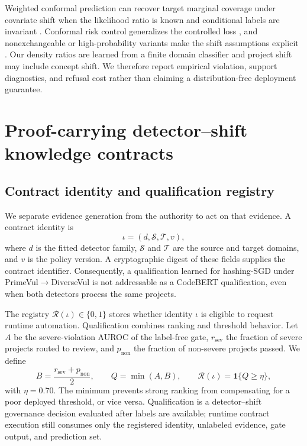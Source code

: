 \documentclass[preprint,12pt]{elsarticle}
\begin{document}
Weighted conformal prediction can recover target marginal coverage under covariate shift when the likelihood ratio is known and conditional labels are invariant \cite{tibshirani2019weightedcp}. Conformal risk control generalizes the controlled loss \cite{angelopoulos2024crc}, and nonexchangeable or high-probability variants make the shift assumptions explicit \cite{farinhas2024necrc,almeida2025hpcrc}. Our density ratios are learned from a finite domain classifier and project shift may include concept shift. We therefore report empirical violation, support diagnostics, and refusal cost rather than claiming a distribution-free deployment guarantee.

\section{Proof-carrying detector--shift knowledge contracts}

\subsection{Contract identity and qualification registry}

We separate evidence generation from the authority to act on that evidence. A contract identity is
\begin{equation}
 \iota=(d,\mathcal S,\mathcal T,v),
 \label{eq:identity}
\end{equation}
where $d$ is the fitted detector family, $\mathcal S$ and $\mathcal T$ are the source and target domains, and $v$ is the policy version. A cryptographic digest of these fields supplies the contract identifier. Consequently, a qualification learned for hashing-SGD under PrimeVul$\rightarrow$DiverseVul is not addressable as a CodeBERT qualification, even when both detectors process the same projects.

The registry $\mathcal R(\iota)\in\{0,1\}$ stores whether identity $\iota$ is eligible to request runtime automation. Qualification combines ranking and threshold behavior. Let $A$ be the severe-violation AUROC of the label-free gate, $r_{\mathrm{sev}}$ the fraction of severe projects routed to review, and $p_{\mathrm{non}}$ the fraction of non-severe projects passed. We define
\begin{equation}
 B=\frac{r_{\mathrm{sev}}+p_{\mathrm{non}}}{2},
 \qquad
 Q=\min(A,B),
 \qquad
 \mathcal R(\iota)=\mathbf 1\{Q\geq\eta\},
 \label{eq:qualification}
\end{equation}
with $\eta=0.70$. The minimum prevents strong ranking from compensating for a poor deployed threshold, or vice versa. Qualification is a detector--shift governance decision evaluated after labels are available; runtime contract execution still consumes only the registered identity, unlabeled evidence, gate output, and prediction set.
\end{document}
